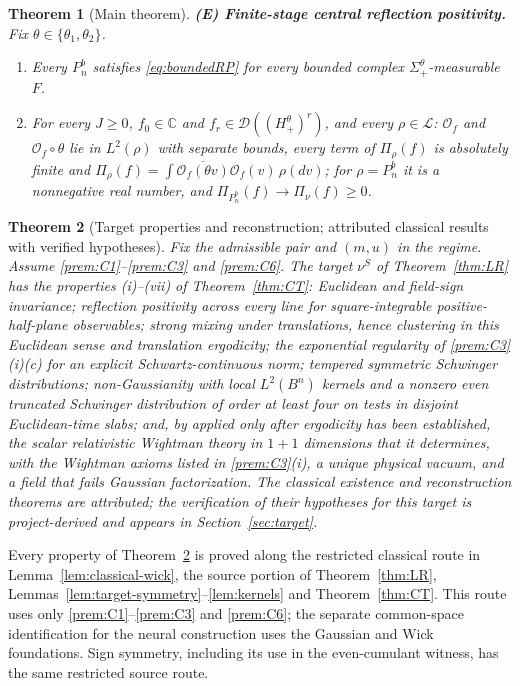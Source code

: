 \documentclass[11pt]{article}
\theoremstyle{plain}
\newtheorem{theorem}{Theorem}[section]
\theoremstyle{definition}
\theoremstyle{remark}
\newcommand{\C}{\mathbb{C}}
\newcommand{\cD}{\mathcal{D}}
\newcommand{\cL}{\mathcal{L}}
\newcommand{\cO}{\mathcal{O}}
\newcommand{\conj}[1]{\overline{#1}}
\begin{document}
\begin{theorem}[Main theorem]
\smallskip\noindent\textbf{(E) Finite-stage central reflection positivity.} Fix
$\theta\in\{\theta_1,\theta_2\}$.
\begin{enumerate}[label=(E\arabic*),leftmargin=3em]
\item Every $P^{b}_{n}$ satisfies \eqref{eq:boundedRP} for every bounded complex
  $\Sigma^{\theta}_{+}$-measurable $F$.
\item For every $J\ge0$, $f_0\in\C$ and $f_r\in\cD((H^{\theta}_{+})^{r})$, and every
  $\rho\in\cL$: $\cO_f$ and $\cO_f\circ\theta$ lie in $L^{2}(\rho)$ with separate
  bounds, every term of $\Pi_{\rho}(f)$ is absolutely finite and
  $\Pi_{\rho}(f)=\int\conj{\cO_f(\theta v)}\cO_f(v)\,\rho(dv)$; for $\rho=P^{b}_{n}$
  it is a nonnegative real number, and $\Pi_{P^{b}_{n}}(f)\to\Pi_{\nu}(f)\ge0$.
\end{enumerate}
\end{theorem}

\begin{theorem}[Target properties and reconstruction; attributed classical
results with verified hypotheses]\label{thm:complement}
Fix the admissible pair and $(m,u)$ in the regime. Assume
\ref{prem:C1}--\ref{prem:C3} and \ref{prem:C6}. The target $\nu^{S}$ of
Theorem~\ref{thm:LR} has the properties (i)--(vii) of Theorem~\ref{thm:CT}:
Euclidean and field-sign invariance; reflection positivity across every line for
square-integrable positive-half-plane observables; strong mixing under
translations, hence clustering in this Euclidean sense and translation
ergodicity; the exponential regularity of \ref{prem:C3}(i)(c) for an explicit
Schwartz-continuous norm; tempered symmetric Schwinger distributions;
non-Gaussianity with local $L^{2}(B^{n})$ kernels and a nonzero even truncated
Schwinger distribution of order at least four on tests in disjoint
Euclidean-time slabs; and, by \cite[Thm.~1.0]{FS1977} applied only after
ergodicity has been established, the scalar relativistic Wightman theory in
$1+1$ dimensions that it determines, with the Wightman axioms listed in
\ref{prem:C3}(i), a unique physical vacuum, and a field that fails Gaussian
factorization. The classical existence and reconstruction theorems are
attributed; the verification of their hypotheses for this target is
project-derived and appears in Section~\ref{sec:target}.
\end{theorem}

Every property of Theorem~\ref{thm:complement} is proved along the restricted
classical route in Lemma~\ref{lem:classical-wick}, the source portion of
Theorem~\ref{thm:LR}, Lemmas~\ref{lem:target-symmetry}--\ref{lem:kernels}
and Theorem~\ref{thm:CT}. This route uses only \ref{prem:C1}--\ref{prem:C3}
and \ref{prem:C6}; the separate common-space identification for the neural
construction uses the Gaussian and Wick foundations. Sign symmetry, including
its use in the even-cumulant witness, has the same restricted source route.
\end{document}
